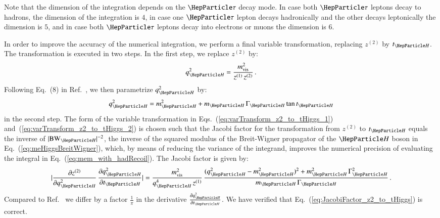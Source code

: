 Note that the dimension of the integration depends on the $\Pgt$ decay
mode.
In case both $\Pgt$ leptons decay to hadrons, the dimension of the
integration is $4$, in case one $\Pgt$ lepton decays hadronically and
the other decays leptonically the dimension is $5$, and in case both
$\Pgt$ leptons decay into electrons or muons the dimension is $6$.
 
In order to improve the accuracy of the numerical integration,
we perform a final variable transformation, replacing $z^{(2)}$ by $t_{\PHiggs}$.
The transformation is executed in two steps. 
In the first step, we replace $z^{(2)}$ by:
\begin{equation}
q_{\PHiggs}^{2} = \frac{m^{2}_{\vis}}{z^{(1)} \, z^{(2)}} \, .
\label{eq:varTransform_z2_to_tHiggs_1}
\end{equation}
Following Eq.~(8) in Ref.~\cite{Alwall:2010cq}, we then parametrize $q_{\PHiggs}^{2}$ by:
\begin{equation}
q_{\PHiggs}^{2} = m_{\PHiggs}^{2} + m_{\PHiggs} \, \Gamma_{\PHiggs}
\tan t_{\PHiggs} 
\label{eq:varTransform_z2_to_tHiggs_2}
\end{equation}
in the second step.
The form of the variable transformation in Eqs.~(\ref{eq:varTransform_z2_to_tHiggs_1}) and~(\ref{eq:varTransform_z2_to_tHiggs_2}) 
is chosen such that the Jacobi factor for the transformation from
$z^{(2)}$ to $t_{\PHiggs}$ equals the inverse of $\vert \BW_{\PHiggs}
\vert^{-2}$, the inverse of the squared modulus
of the Breit-Wigner propagator of the $\PHiggs$ boson in
Eq.~(\ref{eq:meHiggsBreitWigner}),
which, by means of reducing the variance of the integrand,
improves the numerical precision of evaluating the integral 
in Eq.~(\ref{eq:mem_with_hadRecoil}).
The Jacobi factor is given by:
\begin{equation}
\lvert \frac{\partial z^{(2)}}{\partial q_{\PHiggs}^{2}} \, \frac{\partial
  q_{\PHiggs}^{2}}{\partial t_{\PHiggs}} \rvert =
\frac{m^{2}_{\vis}}{q_{\PHiggs}^{4} \, z^{(1)}} \, \frac{(q_{\PHiggs}^{2}
  - m_{\PHiggs}^{2})^{2} + m_{\PHiggs}^{2} \,
  \Gamma_{\PHiggs}^{2}}{m_{\PHiggs} \, \Gamma_{\PHiggs}} \, .
\label{eq:JacobiFactor_z2_to_tHiggs}  
\end{equation}
Compared to Ref.~\cite{Alwall:2010cq} we differ by a factor $\frac{1}{\pi}$ in the derivative 
$\frac{\partial q_{\PHiggs}^{2}}{\partial t_{\PHiggs}}$. We have verified that Eq.~(\ref{eq:JacobiFactor_z2_to_tHiggs}) is correct.

